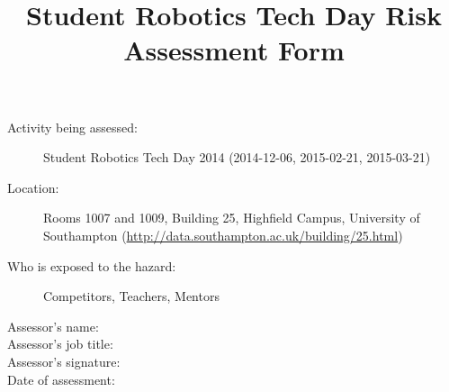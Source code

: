 \documentclass[12pt,a4paper]{scrartcl}
\title{Student Robotics Tech Day Risk Assessment Form}
\begin{document}
\maketitle

\begin{description}
\item[Activity being assessed:] Student Robotics Tech Day 2014 (2014-12-06, 2015-02-21, 2015-03-21)
\item[Location:] Rooms 1007 and 1009, Building 25, Highfield Campus, University of Southampton (\url{http://data.southampton.ac.uk/building/25.html})
\item[Who is exposed to the hazard:] Competitors, Teachers, Mentors
\end{description}

\begin{description}
\item[Assessor's name:]
\item[Assessor's job title:]
\item[Assessor's signature:]
\item[Date of assessment:]
\end{description}
\clearpage

\newcommand{\risk}[3]{
 #1 & #2 & #3 \\
}
\end{document}
